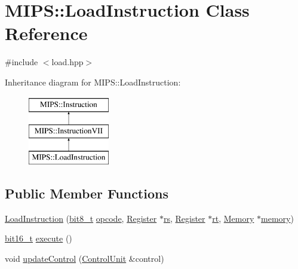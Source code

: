 \hypertarget{classMIPS_1_1LoadInstruction}{}\section{M\+I\+PS\+:\+:Load\+Instruction Class Reference}
\label{classMIPS_1_1LoadInstruction}


{\ttfamily \#include $<$load.\+hpp$>$}

Inheritance diagram for M\+I\+PS\+:\+:Load\+Instruction\+:\begin{figure}[H]
\begin{center}
\leavevmode
\includegraphics[height=3.000000cm]{classMIPS_1_1LoadInstruction}
\end{center}
\end{figure}
\subsection*{Public Member Functions}
\begin{DoxyCompactItemize}
\item 
\hyperlink{classMIPS_1_1LoadInstruction_a7b21d86c1141e18a8303071dfad8ef0a}{Load\+Instruction} (\hyperlink{core_8hpp_a6074bae122ae7b527864eec42c728c3c}{bit8\+\_\+t} \hyperlink{classMIPS_1_1Instruction_a45cc6808b5dde8a5d41067d148b55476}{opcode}, \hyperlink{classMIPS_1_1Register}{Register} $\ast$\hyperlink{classMIPS_1_1InstructionVII_a8e51202e0b22f8e74668f6de95089e60}{rs}, \hyperlink{classMIPS_1_1Register}{Register} $\ast$\hyperlink{classMIPS_1_1InstructionVII_a8710c06b6e7816f330b0c5daea3402a4}{rt}, \hyperlink{classMIPS_1_1Memory}{Memory} $\ast$\hyperlink{classMIPS_1_1InstructionVII_a4fb34750bedbf137b43f9b55b591e0d7}{memory})
\item 
\hyperlink{core_8hpp_adc265a970bc35995b5879784bbb3f1b7}{bit16\+\_\+t} \hyperlink{classMIPS_1_1LoadInstruction_a847fca19fc0b6ea11ddfda930ac3c749}{execute} ()
\item 
void \hyperlink{classMIPS_1_1LoadInstruction_ae3c3bb9306b797e661fbd778767f577d}{update\+Control} (\hyperlink{classMIPS_1_1ControlUnit}{Control\+Unit} \&control)
\end{DoxyCompactItemize}
